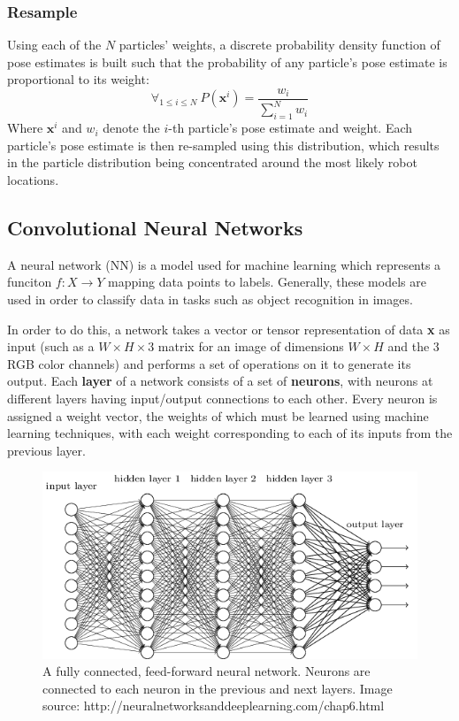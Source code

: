 \documentclass[letterpaper, 12 pt, conference]{ieeeconf}  %
\begin{document}
\subsubsection{Resample} 
Using each of the $N$ particles' weights, a discrete probability density function of pose estimates is built such that the probability of any particle's pose estimate is proportional to its weight: 
$$
\forall _{1\leq i \leq N}~P(\textbf{x}^i)=\frac{w_i}{\sum _{i=1} ^N w_i}
$$
Where $\textbf{x}^i$ and $w_i$ denote the $i$-th particle's pose estimate and weight. Each particle's pose estimate is then re-sampled using this distribution, which results in the particle distribution being concentrated around the most likely robot locations.  

\subsection{Convolutional Neural Networks}

A neural network (NN) is a model used for machine learning which represents a funciton $f:X\to Y$ mapping data points to labels. Generally, these models are used in order to classify data in tasks such as object recognition in images. 
\par
In order to do this, a network takes a vector or tensor representation of data \textbf{x} as input (such as a $W\times H \times 3$ matrix for an image of dimensions $W\times H$ and the 3 RGB color channels) and performs a set of operations on it to generate its output. Each \textbf{layer} of a network consists of a set of \textbf{neurons}, with neurons at different layers having input/output connections to each other. Every neuron is assigned a weight vector, the weights of which must be learned using machine learning techniques, with each weight corresponding to each of its inputs from the previous layer.  

\begin{figure}[h]
\centering
\includegraphics[scale=0.75]{neural_net}
\caption{A fully connected, feed-forward neural network. Neurons are connected to each neuron in the previous and next layers. Image source: http://neuralnetworksanddeeplearning.com/chap6.html}
\end{figure}
\end{document}
